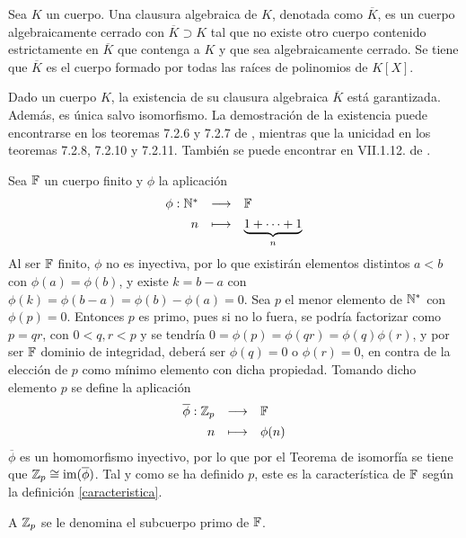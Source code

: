 \begin{deff}{\cite[p.~92]{Rosenberger}}
Sea $K$ un cuerpo. Una clausura algebraica de $K$, denotada como $\overline{K}$, es un cuerpo algebraicamente cerrado con $\overline{K} \supset K$ tal que no existe otro cuerpo contenido estrictamente en $\overline{K}$ que contenga a $K$ y que sea algebraicamente cerrado. Se tiene que $\overline{K}$ es el cuerpo formado por todas las raíces de polinomios de $K[X]$.\cite[VII.1.9.]{GamboaAnillos}

\item Dado un cuerpo $K$, la existencia de su clausura algebraica $\overline{K}$ está garantizada. Además, es única salvo isomorfismo. La demostración de la existencia puede encontrarse en los teoremas 7.2.6 y 7.2.7 de \cite{Rosenberger}, mientras que la unicidad en los teoremas 7.2.8, 7.2.10 y 7.2.11. También se puede encontrar en VII.1.12. de \cite{GamboaAnillos}.
\end{deff}

\begin{prop}\label{caracteristica_primo}
\end{prop}

\begin{dem}{\cite[p.~411]{GamboaAnillos}}
    Sea $\mathbb{F}$ un cuerpo finito y $\phi$ la aplicación
    \[
    \begin{array}{rcl}
    \phi : \mathbb{N}^* & \longrightarrow & \mathbb{F} \\[1ex]
            n & \longmapsto & \underbrace{1 +  \cdots + 1}_{n}
    \end{array}
    \]
    Al ser $\mathbb{F}$ finito, $\phi$ no es inyectiva, por lo que existirán elementos distintos $a<b$ con $\phi(a) = \phi (b)$, y existe $k = b-a$ con $\phi(k) = \phi(b-a) = \phi (b) - \phi (a) = 0$. Sea $p$ el menor elemento de $\mathbb{N}^*$ con $\phi(p) = 0$. Entonces $p$ es primo, pues si no lo fuera, se podría factorizar como $p = qr$, con $0<q,r<p$ y se tendría $0 = \phi(p) = \phi(qr) = \phi(q)\phi(r)$, y por ser $\mathbb{F}$ dominio de integridad, deberá ser $\phi(q) = 0$ o $\phi(r) = 0$, en contra de la elección de $p$ como mínimo elemento con dicha propiedad. Tomando dicho elemento $p$ se define la aplicación 
    \[
    \begin{array}{rcl}
    \overline{\phi} : \mathbb{Z}_p & \longrightarrow & \mathbb{F} \\[1ex]
            n & \longmapsto & \phi(n)
    \end{array}
    \]
    $\overline{\phi}$ es un homomorfismo inyectivo, por lo que por el Teorema de isomorfía se tiene que $\mathbb{Z}_p \cong \text{im}(\overline{\phi})$. Tal y como se ha definido $p$, este es la característica de $\mathbb{F}$ según la definición \ref{caracteristica}.
    
    A $\mathbb{Z}_p$ se le denomina el subcuerpo primo de $\mathbb{F}$. 
    
\end{dem}


